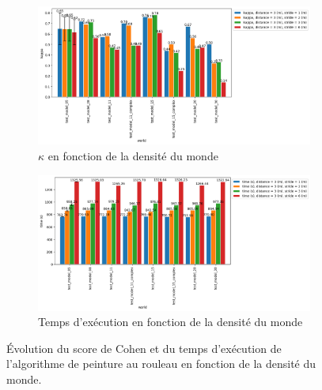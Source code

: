 \documentclass[francais,RandD]{rapportPFE}
\begin{document}
			\begin{figure}[h!]
				\centering
				\begin{subfigure}[t]{0.9\linewidth}
					\includegraphics[width=\linewidth]{graphics/ski_nordique-kappa_vs_world_for_each_s.png}
					\caption{$\kappa$ en fonction de la densité du monde}
					\label{fig:ski_nordique-kappa_vs_world_s}
				\end{subfigure}
				\hfill
				\begin{subfigure}[t]{0.9\linewidth}
						\includegraphics[width=\linewidth]{graphics/ski_nordique-time_vs_world_for_each_s.png}
						\caption{Temps d'exécution en fonction de la densité du monde}
						\label{fig:ski_nordique-time_vs_world_s}
				\end{subfigure}
				\caption{Évolution du score de Cohen et du temps d'exécution de l'algorithme de peinture au rouleau en fonction de la densité du monde.}
				\label{fig:ski_nordique-world_s}
			\end{figure}
\end{document}
